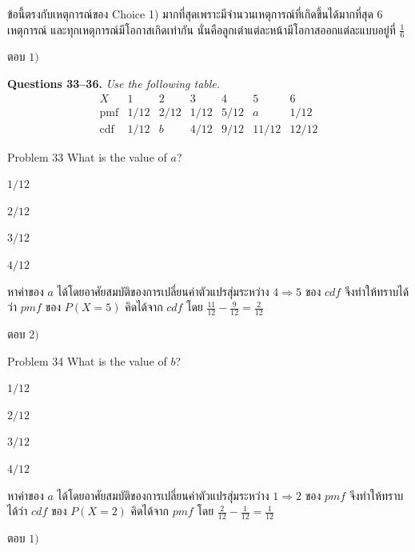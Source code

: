 \documentclass[11pt]{scrartcl}
\newcommand{\groupctx}[2]{\bigskip\noindent\textbf{Questions #1.} \textit{#2}\par\medskip}
\begin{document}
\begin{solutionbox}
  ข้อนี้ตรงกับเหตุการณ์ของ Choice 1) มากที่สุดเพราะมีจำนวนเหตุการณ์ที่เกิดขึ้นได้มากที่สุด 6 เหตุการณ์
  และทุกเหตุการณ์มีโอกาสเกิดเท่ากัน นั่นคือลูกเต๋าแต่ละหน้ามีโอกาสออกแต่ละแบบอยู่ที่ $\frac{1}{6}$

  ตอบ $\boxed{1)}$
\end{solutionbox}

\groupctx{33--36}{Use the following table.
\[
\begin{array}{c|cccccc}
X & 1 & 2 & 3 & 4 & 5 & 6 \\
\hline
\text{pmf} & 1/12 & 2/12 & 1/12 & 5/12 & a & 1/12 \\
\text{cdf} & 1/12 & b & 4/12 & 9/12 & 11/12 & 12/12
\end{array}
\]}
 
\begin{problembox}{Problem 33}
What is the value of $a$?
 
\begin{choices}
\item $1/12$
\item $2/12$
\item $3/12$
\item $4/12$
\end{choices}
\end{problembox}

\begin{solutionbox}
  หาค่าของ $a$ ได้โดยอาศัยสมบัติของการเปลี่ยนค่าตัวแปรสุ่มระหว่าง $4 \Rightarrow 5$ ของ $cdf$
  จึงทำให้ทราบได้ว่า $pmf$ ของ $P(X=5)$ คิดได้จาก $cdf$ โดย $\frac{11}{12}-\frac{9}{12}=\frac{2}{12}$
  
  ตอบ $\boxed{2)}$
\end{solutionbox}
 
\begin{problembox}{Problem 34}
What is the value of $b$?
 
\begin{choices}
\item $1/12$
\item $2/12$
\item $3/12$
\item $4/12$
\end{choices}
\end{problembox}

\begin{solutionbox}
  หาค่าของ $a$ ได้โดยอาศัยสมบัติของการเปลี่ยนค่าตัวแปรสุ่มระหว่าง $1 \Rightarrow 2$ ของ $pmf$
  จึงทำให้ทราบได้ว่า $cdf$ ของ $P(X=2)$ คิดได้จาก $pmf$ โดย $\frac{2}{12}-\frac{1}{12}=\frac{1}{12}$

  ตอบ $\boxed{1)}$
\end{solutionbox}
 
\end{document}
